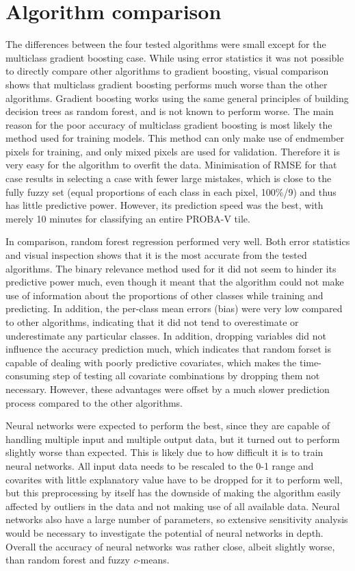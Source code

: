 \documentclass[a4paper,10pt]{book}
\begin{document}
\section{Algorithm comparison}

The differences between the four tested algorithms were small except for the multiclass gradient boosting case. While using error statistics it was not possible to directly compare other algorithms to gradient boosting, visual comparison shows that multiclass gradient boosting performs much worse than the other algorithms. Gradient boosting works using the same general principles of building decision trees as random forest, and is not known to perform worse. The main reason for the poor accuracy of multiclass gradient boosting is most likely the method used for training models. This method can only make use of endmember pixels for training, and only mixed pixels are used for validation. Therefore it is very easy for the algorithm to overfit the data. Minimisation of RMSE for that case results in selecting a case with fewer large mistakes, which is close to the fully fuzzy set (equal proportions of each class in each pixel, 100\%/9) and thus has little predictive power. However, its prediction speed was the best, with merely 10 minutes for classifying an entire PROBA-V tile.

In comparison, random forest regression performed very well. Both error statistics and visual inspection shows that it is the most accurate from the tested algorithms. The binary relevance method used for it did not seem to hinder its predictive power much, even though it meant that the algorithm could not make use of information about the proportions of other classes while training and predicting. In addition, the per-class mean errors (bias) were very low compared to other algorithms, indicating that it did not tend to overestimate or underestimate any particular classes. In addition, dropping variables did not influence the accuracy prediction much, which indicates that random forset is capable of dealing with poorly predictive covariates, which makes the time-consuming step of testing all covariate combinations by dropping them not necessary. However, these advantages were offset by a much slower prediction process compared to the other algorithms.

Neural networks were expected to perform the best, since they are capable of handling multiple input and multiple output data, but it turned out to perform slightly worse than expected. This is likely due to how difficult it is to train neural networks. All input data needs to be rescaled to the 0-1 range and covarites with little explanatory value have to be dropped for it to perform well, but this preprocessing by itself has the downside of making the algorithm easily affected by outliers in the data and not making use of all available data. Neural networks also have a large number of parameters, so extensive sensitivity analysis would be necessary to investigate the potential of neural networks in depth. Overall the accuracy of neural networks was rather close, albeit slightly worse, than random forest and fuzzy \textit{c}-means.
\end{document}

